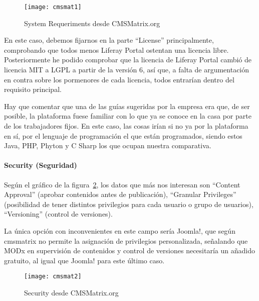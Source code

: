 \begin{figure}
\begin{narrow}{-0.12\linewidth}{-0.12\linewidth}
\centering
\texttt{[image: cmsmat1]}
\caption{System Requeriments desde CMSMatrix.org}
\label{fig:cmsmat1}
\end{narrow}
\end{figure}

\par En este caso, debemos fijarnos en la parte ``License'' principalmente, comprobando que todos menos Liferay Portal ostentan una licencia libre. Posteriormente he podido comprobar que la licencia de Liferay Portal cambió de licencia MIT a LGPL a partir de la versión 6\cite{references:liferaylicense}, así que, a falta de argumentación en contra sobre los pormenores de cada licencia, todos entrarían dentro del requisito principal.

\par Hay que comentar que una de las guías sugeridas por la empresa era que, de ser posible, la plataforma fuese familiar con lo que ya se conoce en la casa por parte de los trabajadores fijos. En este caso, las cosas irían si no ya por la plataforma en sí, por el lenguaje de programación el que están programados, siendo estos Java, PHP, Phyton y C Sharp los que ocupan nuestra comparativa.

\paragraph{Security (Seguridad)}

\par Según el gráfico de la figura~\ref{fig:cmsmat2}, los datos que más nos interesan son ``Content Approval'' (aprobar contenidos antes de publicación), ``Granular Privileges'' (posibilidad de tener distintos privilegios para cada usuario o grupo de usuarios), ``Versioning'' (control de versiones).

\par La única opción con inconvenientes en este campo sería Joomla!, que según cmsmatrix no permite la asignación de privilegios personalizada, señalando que MODx en supervisión de contenidos y control de versiones necesitaría un añadido gratuito, al igual que Joomla! para este último caso.

\begin{figure}
\begin{narrow}{-0.12\linewidth}{-0.12\linewidth}
\centering
\texttt{[image: cmsmat2]}
\caption{Security desde CMSMatrix.org}
\label{fig:cmsmat2}
\end{narrow}
\end{figure}

